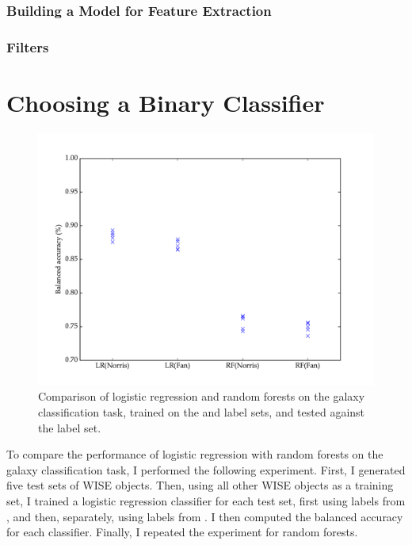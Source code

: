     \subsubsection{Building a Model for Feature Extraction}
    \label{sec:feature-extraction-model}

    \subsubsection{Filters}
    \label{sec:image-filters}

\section{Choosing a Binary Classifier}
\label{sec:binary-classifiers}
  
  \begin{figure}[!ht]
    \centering
    \includegraphics[width=\textwidth]{images/experiments/lr_rf}
    \caption{Comparison of logistic regression and random forests on the galaxy classification task, trained on the \citet{norris06} and \citet{fan15} label sets, and tested against the \citet{norris06} label set.}
  \end{figure}

  To compare the performance of logistic regression with random forests on the galaxy classification task, I performed the following experiment. First, I generated five test sets of WISE objects. Then, using all other WISE objects as a training set, I trained a logistic regression classifier for each test set, first using labels from \citet{norris06}, and then, separately, using labels from \citet{fan15}. I then computed the balanced accuracy for each classifier. Finally, I repeated the experiment for random forests.

